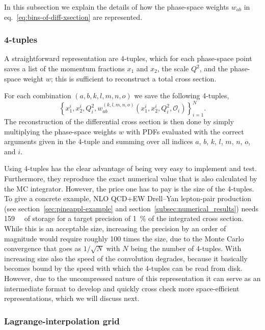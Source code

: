 In this subsection we explain the details of how the phase-space weights $w_{ab}$ in eq.~\eqref{eq:bins-of-diff-xsection} are represented.

\subsubsection{4-tuples}

A straightforward representation are 4-tuples, which for each phase-space point saves a list of the momentum fractions $x_1$ and $x_2$, the scale $Q^2$, and the phase-space weight $w$; this is sufficient to reconstruct a total cross section.

For each combination $(a,b,k,l,m,n,o)$ we save the following 4-tuples,
\begin{equation}
\left\{ x_1^i, x_2^i, Q^2_i, w^{(k,l,m,n,o)}_{ab} (x_1^i, x_2^i, Q^2_i, \mathcal{O}_i) \right\}_{i=1}^N \text{.} \label{eq:four-tuples}
\end{equation}
The reconstruction of the differential cross section is then done by simply multiplying the phase-space weights $w$ with PDFs evaluated with the correct arguments given in the 4-tuple and summing over all indices $a$, $b$, $k$, $l$, $m$, $n$, $o$, and $i$.

Using 4-tuples has the clear advantage of being very easy to implement and test.
Furthermore, they reproduce the exact numerical value that is also calculated by the MC integrator.
However, the price one has to pay is the size of the 4-tuples.
To give a concrete example, NLO QCD+EW Drell--Yan lepton-pair production (see section~\ref{sec:pineappl-example} and section~\ref{subsec:numerical_results}) needs \SI{159}{\giga\byte} of storage for a target precision of \SI{1}{\percent} of the integrated cross section.
While this is an acceptable size, increasing the precision by an order of magnitude would require roughly 100 times the size, due to the Monte Carlo convergence that goes as $1/\sqrt{N}$ with $N$ being the number of 4-tuples.
With increasing size also the speed of the convolution degrades, because it basically becomes bound by the speed with which the 4-tuples can be read from disk.
However, due to the uncompressed nature of this representation it can serve as an intermediate format to develop and quickly cross check more space-efficient representations, which we will discuss next.

\subsubsection{Lagrange-interpolation grid}

